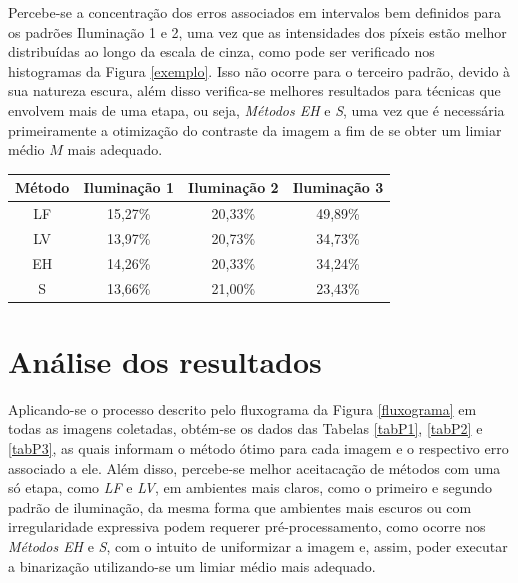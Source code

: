 \documentclass{ceel}
\begin{document}
\begin{multicols}{2}
\begin{minipage}[h]{\columnwidth}
\vspace{-0.1cm}
\caption{Imagens resultantes da Binarização em Sub-regiões para o QR Code 3 nos padrões de (a) Iluminação 1, (c) Iluminação 2 e (e) Iluminação 3, com suas respectivas imagens diferença em (b), (d) e (f).} \label{figS}
\end{minipage}

\vspace{0.5cm}
Percebe-se a concentração dos erros associados em intervalos bem definidos para os padrões Iluminação 1 e 2, uma vez que as intensidades dos píxeis estão melhor distribuídas ao longo da escala de cinza, como pode ser verificado nos histogramas da Figura \ref{exemplo}. Isso não ocorre para o terceiro padrão, devido à sua natureza escura, além disso verifica-se melhores resultados para técnicas que envolvem mais de uma etapa, ou seja, \emph{Métodos EH} e \emph{S}, uma vez que é necessária primeiramente a otimização do contraste da imagem a fim de se obter um limiar médio $M$ mais adequado. 

\vspace{0.3cm}
\begin{minipage}[h]{\columnwidth}
\begin{scriptsize}
\def\arraystretch{1.35}
    \captionsetup{type=table}
    \begin{center}
    \caption{Erros associados às capturas de imagem do QR Code 3} \label{tabela-erros} \vspace{-0.2cm}
    \begin{tabular}{ c  c  c  c } \hline
    \textbf{Método}&  \textbf{Iluminação 1}& \textbf{Iluminação 2}& \textbf{Iluminação 3}\\\hline
     LF & 15,27\% & 20,33\% & 49,89\%\\
     LV & 13,97\% & 20,73\% & 34,73\%\\
     EH & 14,26\% & 20,33\% & 34,24\%\\
     S   & 13,66\% & 21,00\% & 23,43\%\\\hline
    \end{tabular}
   \end{center}
\end{scriptsize}
\end{minipage}


\section{Análise dos resultados} \label{resultados}
Aplicando-se o processo descrito pelo fluxograma da Figura \ref{fluxograma} em todas as imagens coletadas, obtém-se os dados das Tabelas \ref{tabP1}, \ref{tabP2} e \ref{tabP3}, as quais informam o método ótimo para cada imagem e o respectivo erro associado a ele. Além disso, percebe-se melhor aceitacação de métodos com uma só etapa, como \emph{LF} e \emph{LV}, em ambientes mais claros, como o primeiro e segundo padrão de iluminação, da mesma forma que ambientes mais escuros ou com irregularidade expressiva podem requerer pré-processamento, como ocorre nos \emph{Métodos EH} e \emph{S}, com o intuito de uniformizar a imagem e, assim, poder executar a binarização utilizando-se um limiar médio mais adequado.


\end{multicols}
\end{document}
